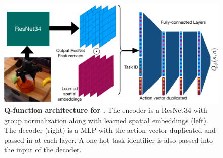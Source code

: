 \begin{figure}
\vspace{-0.5cm}
    \centering
    \setcounter{figure}{1}
  \includegraphics[width=0.75\linewidth]{chapters/ptr/architecture.pdf}
  \vspace{-0.2cm}
  \caption{\footnotesize{\textbf{Q-function architecture for \ptrmethodname.} The encoder is a ResNet34 with group normalization along with learned spatial embeddings (left). The decoder (right) is a MLP with the action vector duplicated and passed in at each layer. A one-hot task identifier is also passed into the input of the decoder.}}
  \vspace{-0.3cm}
  \label{fig:arch}
\end{figure}


